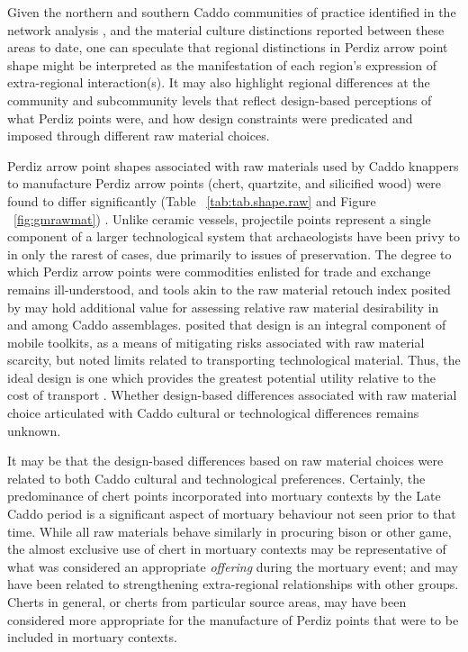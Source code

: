 \documentclass[review]{elsarticle}
\begin{document}
Given the northern and southern Caddo communities of practice identified in the network analysis \citep{RN8031}, and the material culture distinctions reported between these areas to date, one can speculate that regional distinctions in Perdiz arrow point shape might be interpreted as the manifestation of each region's expression of extra-regional interaction(s). It may also highlight regional differences at the community and subcommunity levels that reflect design-based perceptions of what Perdiz points were, and how design constraints were predicated and imposed through different raw material choices.

Perdiz arrow point shapes associated with raw materials used by Caddo knappers to manufacture Perdiz arrow points (chert, quartzite, and silicified wood) were found to differ significantly (Table ~\ref{tab:tab.shape.raw} and Figure ~\ref{fig:gmrawmat}) \citep{RN8980}. Unlike ceramic vessels, projectile points represent a single component of a larger technological system that archaeologists have been privy to in only the rarest of cases, due primarily to issues of preservation. The degree to which Perdiz arrow points were commodities enlisted for trade and exchange remains ill-understood, and tools akin to the raw material retouch index posited by \citet{RN6541} may hold additional value for assessing relative raw material desirability in and among Caddo assemblages. \citet{RN6363} posited that design is an integral component of mobile toolkits, as a means of mitigating risks associated with raw material scarcity, but noted limits related to transporting technological material. Thus, the ideal design is one which provides the greatest potential utility relative to the cost of transport \citep{RN6363}. Whether design-based differences associated with raw material choice articulated with Caddo cultural or technological differences remains unknown.

It may be that the design-based differences based on raw material choices were related to both Caddo cultural and technological preferences. Certainly, the predominance of chert points incorporated into mortuary contexts by the Late Caddo period is a significant aspect of mortuary behaviour not seen prior to that time. While all raw materials behave similarly in procuring bison or other game, the almost exclusive use of chert in mortuary contexts may be representative of what was considered an appropriate \textit{offering} during the mortuary event; and may have been related to strengthening extra-regional relationships with other groups. Cherts in general, or cherts from particular source areas, may have been considered more appropriate for the manufacture of Perdiz points that were to be included in mortuary contexts.  
\end{document}
